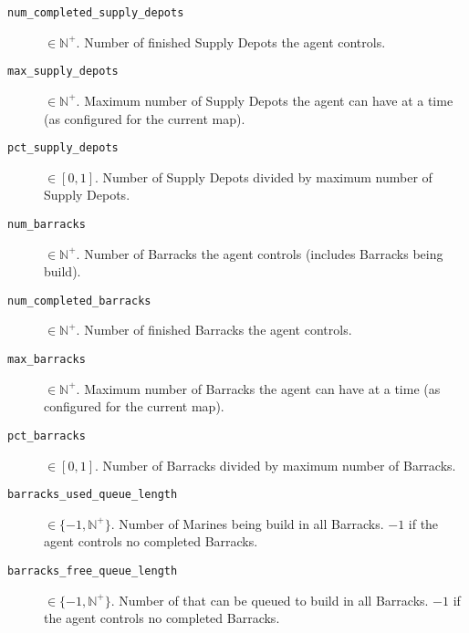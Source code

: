 \begin{description}
    \item[\texttt{num\_completed\_supply\_depots}] $\in \mathbb{N}^+$. Number of finished Supply Depots the agent controls.
    \item[\texttt{max\_supply\_depots}] $\in \mathbb{N}^+$. Maximum number of Supply Depots the agent can have at a time (as configured for the current map).
    \item[\texttt{pct\_supply\_depots}] $\in [0,1]$. Number of Supply Depots divided by maximum number of Supply Depots.
    \item[\texttt{num\_barracks}] $\in \mathbb{N}^+$. Number of Barracks the agent controls (includes Barracks being build).
    \item[\texttt{num\_completed\_barracks}] $\in \mathbb{N}^+$. Number of finished Barracks the agent controls.
    \item[\texttt{max\_barracks}] $\in \mathbb{N}^+$. Maximum number of Barracks the agent can have at a time (as configured for the current map).
    \item[\texttt{pct\_barracks}] $\in [0,1]$. Number of Barracks divided by maximum number of Barracks.
    \item[\texttt{barracks\_used\_queue\_length}] $\in \{-1, \mathbb{N}^+\}$. Number of Marines being build in all Barracks. $-1$ if the agent controls no completed Barracks.
    \item[\texttt{barracks\_free\_queue\_length}] $\in \{-1, \mathbb{N}^+\}$. Number of that can be queued to build in all Barracks. $-1$ if the agent controls no completed Barracks.
\end{description}

